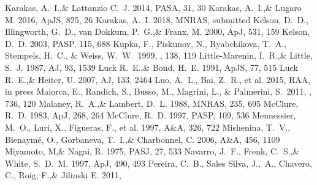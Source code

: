 \documentclass[a4paper,fleqn,usenatbib]{mnras}
\begin{document}
\begin{thebibliography}{99}
Karakas, A.~I.,\& Lattanzio C.~J. 2014, 
PASA, 31, 30
Karakas, A.~I.,\& Lugaro M. 2016, 
ApJS, 825, 26
Karakas, A.~I. 2018, 
MNRAS, submitted
Kelson, D.~D., Illingworth, G.~D., van Dokkum, P.~G.,\& Franx, M. 2000, ApJ, 531, 159
Kelson, D.~D. 2003, 
PASP, 115, 688
 Kupka, F., Piskunov, N., Ryabchikova, T.~A., Stempels, H.~C., \& Weiss, W.~W.\ 1999, \aaps, 138, 119 
Little-Marenin, I.~R.,\& Little, S.~J. 1987, 
AJ, 93, 1539
Luck R.~E.,\& Bond, H.~E. 1991, 
ApJS, 77, 515
Luck R.~E.,\& Heiter, U. 2007, 
AJ, 133, 2464
Luo, A.~L., Bai, Z.~R., et al. 2015, 
RAA, in press
 Maiorca, E., Randich, S., Busso, M., Magrini, L., \& Palmerini, S.\ 2011, \apj, 736, 120 
Malaney, R.~A.,\& Lambert, D.~L. 1988, 
MNRAS, 235, 695
McClure, R.~D. 1983, 
ApJ, 268, 264
McClure, R.~D. 1997, 
PASP, 109, 536
Mennessier, M.~O., Luri, X., Figueras, F., et al. 1997, 
A$\&$A, 326, 722
Mishenina, T.~V., Bienaym\' e, O., Gorbaneva, T.~I.,\& Charbonnel, C. 2006, 
A$\&$A, 456, 1109
Miyamoto, M,\& Nagai, R. 1975, 
PASJ, 27, 533
Navarro, J.~F., Frenk, C.~S.,\& White, S.~D.~M. 1997, 
ApJ, 490, 493
Pereira, C.~B., Sales Silva, J.,~A., Chavero, C., Roig, F.,\& Jilinski E. 2011, 

\end{thebibliography}
\end{document}
